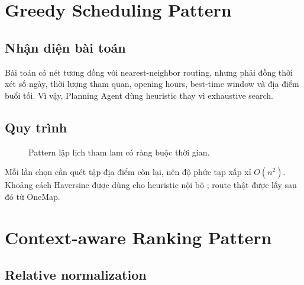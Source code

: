 \section{Greedy Scheduling Pattern}

\subsection{Nhận diện bài toán}

Bài toán có nét tương đồng với nearest-neighbor routing, nhưng phải đồng thời xét số ngày, thời lượng tham quan, opening hours, best-time window và địa điểm buổi tối. Vì vậy, Planning Agent dùng heuristic  thay vì exhaustive search.

\subsection{Quy trình}

\begin{figure}[H]
\centering
{}
\caption{Pattern lập lịch tham lam có ràng buộc thời gian.}
\label{fig:greedy-pattern}
\end{figure}

Mỗi lần chọn cần quét tập địa điểm còn lại, nên độ phức tạp xấp xỉ \(O(n^2)\). Khoảng cách Haversine được dùng cho heuristic nội bộ \cite{haversine}; route thật được lấy sau đó từ OneMap.

\section{Context-aware Ranking Pattern}

\subsection{Relative normalization}

